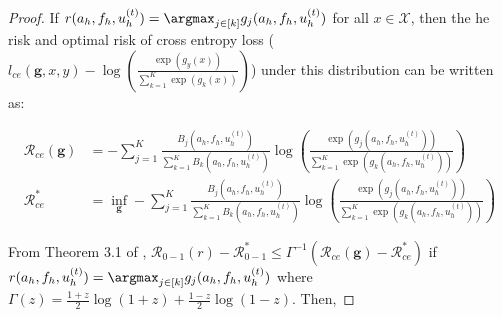 \documentclass{article} %
\begin{document}
\begin{proof}
If $r(a_h, f_h, u^{(t)}_h) = \argmax_{j \in [k]} g_j(a_h, f_h, u^{(t)}_h)$ for all $x \in \mathcal{X}$, then the he risk and optimal risk of cross entropy loss ($l_{ce}(\mathbf{g}, x, y)-\log\left(\frac{\exp\left(g_y(x)\right)}{\sum_{k = 1}^K\exp\left(g_k(x)\right)}\right)$) under this distribution can be written as:

\begin{align*}
    \mathcal{R}_{ce}(\mathbf{g}) &= -\sum_{j = 1}^K \frac{B_j(a_h, f_h, u^{(t)}_h)}{\sum_{k = 1}^K B_k(a_h, f_h, u^{(t)}_h)}\log\left(\frac{\exp\left(g_j(a_h, f_h, u^{(t)}_h)\right)}{\sum_{k = 1}^K\exp\left(g_k(a_h, f_h, u^{(t)}_h)\right)}\right) \\
    \mathcal{R}_{ce}^* &= \inf_{\mathbf{g}} -\sum_{j = 1}^K \frac{B_j(a_h, f_h, u^{(t)}_h)}{\sum_{k = 1}^K B_k(a_h, f_h, u^{(t)}_h)}\log\left(\frac{\exp\left(g_j(a_h, f_h, u^{(t)}_h)\right)}{\sum_{k = 1}^K\exp\left(g_k(a_h, f_h, u^{(t)}_h)\right)}\right) 
\end{align*}

From Theorem 3.1 of \citep{mao2023cross}, $\mathcal{R}_{0-1}(r) - \mathcal{R}_{0-1}^* \leq \Gamma^{-1}\left(\mathcal{R}_{ce}(\mathbf{g}) - \mathcal{R}_{ce}^*\right)$ if $r(a_h, f_h, u^{(t)}_h) = \argmax_{j \in [k]} g_j(a_h, f_h, u^{(t)}_h)$ where $\Gamma(z) = \frac{1 + z}{2}\log(1 + z) + \frac{1 - z}{2}\log(1 - z)$. Then,


\end{proof}
\end{document}
